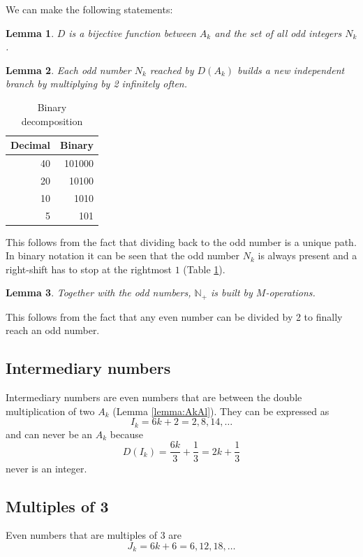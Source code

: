 \documentclass[10pt,a4paper]{article}
\newtheorem{lemma}{Lemma}
\begin{document}
We can make the following statements:
\begin{lemma}
$D$ is a bijective function between $A_k$ and the set of all odd integers $N_k$.
\end{lemma}
\begin{lemma}
Each odd number $N_k$ reached by $D(A_k)$ builds a new independent branch by multiplying by 2 infinitely often.
\end{lemma}
\begin{table}[!htb]
\centering
\begin{tabular}{|r|r|}
\hline
	Decimal & Binary \\
\hline
	40 & 101000 \\
	20 & 10100 \\
	10 & 1010 \\
	5 & 101 \\
\hline
\end{tabular}
\caption{Binary decomposition}
\label{table:binary_decomp}
\end{table}
This follows from the fact that dividing back to the odd number is a unique path. In binary notation it can be seen that the odd number $N_k$ is always present and a right-shift has to stop at the rightmost $1$ (Table \ref{table:binary_decomp}).

\begin{lemma}
Together with the odd numbers, $\mathbb{N}_+$ is built by $M$-operations.
\label{lemma:nplus}
\end{lemma}
This follows from the fact that any even number can be divided by 2 to finally reach an odd number.

\subsection{Intermediary numbers}
Intermediary numbers are even numbers that are between the double multiplication of two $A_k$ (Lemma \ref{lemma:AkAl}). They can be expressed as
\begin{equation}
I_k=6k+2=2,8,14,\ldots
\end{equation}
and can never be an $A_k$ because
\begin{equation}
D(I_k)=\frac{6k}{3}+\frac{1}{3}=2k+\frac{1}{3}
\end{equation}
never is an integer.
\subsection{Multiples of 3}
Even numbers that are multiples of 3 are
\begin{equation}
J_k=6k+6=6,12,18,\ldots
\end{equation}
\end{document}
